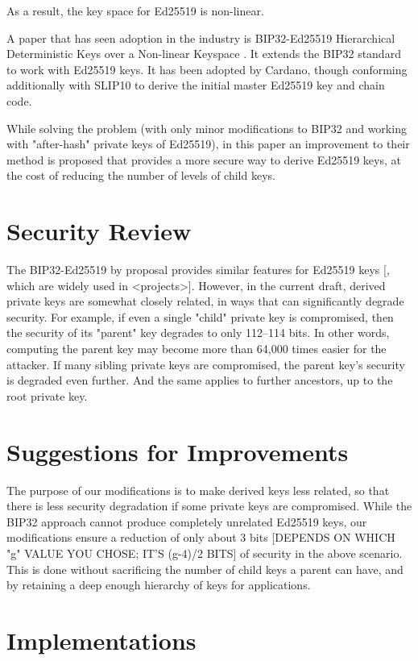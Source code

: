\documentclass[12pt, a4paper, twocolumn]{article}
\begin{document}
As a result, the key space for Ed25519 is non-linear.

A paper that has seen adoption in the industry is BIP32-Ed25519
Hierarchical Deterministic Keys over a Non-linear Keyspace \cite{BIP32-Ed25519}. It extends the BIP32 standard to work with Ed25519 keys. It has been adopted by Cardano, though conforming additionally with SLIP10 to derive the initial master Ed25519 key and chain code.

While solving the problem (with only minor modifications to BIP32 and working with "after-hash" private keys of Ed25519), in this paper an improvement to their method is proposed that provides a more secure way to derive Ed25519 keys, at the cost of reducing the number of levels of child keys.


\section{Security Review}

The BIP32-Ed25519 by  proposal provides similar features for Ed25519 keys [, which are widely used in <projects>]. However, in the current draft, derived private keys are somewhat closely related, in ways that can significantly degrade security. For example, if even a single "child" private key is compromised, then the security of its "parent" key degrades to only 112--114 bits. In other words, computing the parent key may become more than 64,000 times easier for the attacker. If many sibling private keys are compromised, the parent key's security is degraded even further. And the same applies to further ancestors, up to the root private key.


\section{Suggestions for Improvements}

The purpose of our modifications is to make derived keys less related, so that there is less security degradation if some private keys are compromised. While the BIP32 approach cannot produce completely unrelated Ed25519 keys, our modifications ensure a reduction of only about 3 bits [DEPENDS ON WHICH "g" VALUE YOU CHOSE; IT'S (g-4)/2 BITS] of security in the above scenario. This is done without sacrificing the number of child keys a parent can have, and by retaining a deep enough hierarchy of keys for applications.

\section{Implementations}
\end{document}
